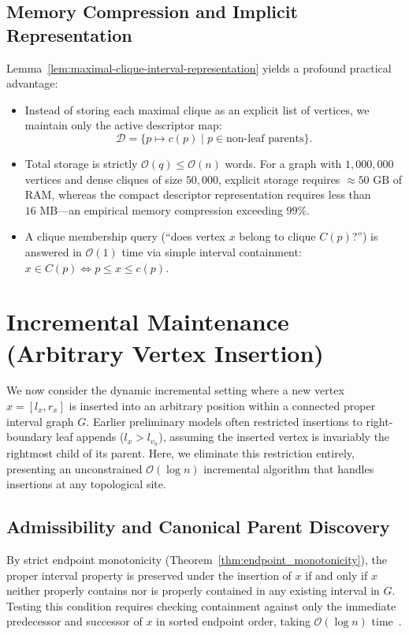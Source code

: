 \subsection{Memory Compression and Implicit Representation}
Lemma~\ref{lem:maximal-clique-interval-representation} yields a profound practical advantage:
\begin{itemize}
    \item Instead of storing each maximal clique as an explicit list of vertices, we maintain only the active descriptor map:
    \begin{equation}
        \mathcal{D} = \{ p \mapsto c(p) \mid p \in \text{non-leaf parents} \}.
    \end{equation}
    \item Total storage is strictly $\mathcal{O}(q) \le \mathcal{O}(n)$ words. For a graph with $1,000,000$ vertices and dense cliques of size $50,000$, explicit storage requires $\approx 50\text{ GB}$ of RAM, whereas the compact descriptor representation requires less than $16\text{ MB}$---an empirical memory compression exceeding $99\%$.
    \item A clique membership query (``does vertex $x$ belong to clique $C(p)$?'') is answered in $\mathcal{O}(1)$ time via simple interval containment: $x \in C(p) \iff p \le x \le c(p)$.
\end{itemize}

\section{Incremental Maintenance (Arbitrary Vertex Insertion)}
\label{sec:dynamic_incremental}

We now consider the dynamic incremental setting where a new vertex $x = [l_x, r_x]$ is inserted into an arbitrary position within a connected proper interval graph $G$. Earlier preliminary models often restricted insertions to right-boundary leaf appends ($l_x > l_{v_n}$), assuming the inserted vertex is invariably the rightmost child of its parent. Here, we eliminate this restriction entirely, presenting an unconstrained $\mathcal{O}(\log n)$ incremental algorithm that handles insertions at any topological site.

\subsection{Admissibility and Canonical Parent Discovery}
By strict endpoint monotonicity (Theorem~\ref{thm:endpoint_monotonicity}), the proper interval property is preserved under the insertion of $x$ if and only if $x$ neither properly contains nor is properly contained in any existing interval in $G$. Testing this condition requires checking containment against only the immediate predecessor and successor of $x$ in sorted endpoint order, taking $\mathcal{O}(\log n)$ time~\cite{chen2024distance}.

